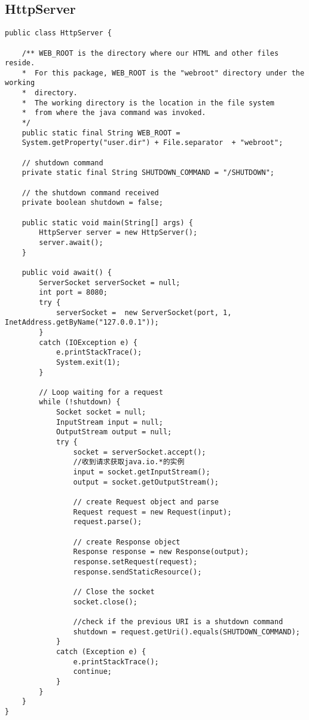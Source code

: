 \subsection{HttpServer}
\begin{lstlisting}
public class HttpServer {
	
	/** WEB_ROOT is the directory where our HTML and other files reside.
	*  For this package, WEB_ROOT is the "webroot" directory under the working
	*  directory.
	*  The working directory is the location in the file system
	*  from where the java command was invoked.
	*/
	public static final String WEB_ROOT =
	System.getProperty("user.dir") + File.separator  + "webroot";
	
	// shutdown command
	private static final String SHUTDOWN_COMMAND = "/SHUTDOWN";
	
	// the shutdown command received
	private boolean shutdown = false;
	
	public static void main(String[] args) {
		HttpServer server = new HttpServer();
		server.await();
	}
	
	public void await() {
		ServerSocket serverSocket = null;
		int port = 8080;
		try {
			serverSocket =  new ServerSocket(port, 1, InetAddress.getByName("127.0.0.1"));
		}
		catch (IOException e) {
			e.printStackTrace();
			System.exit(1);
		}
		
		// Loop waiting for a request
		while (!shutdown) {
			Socket socket = null;
			InputStream input = null;
			OutputStream output = null;
			try {
				socket = serverSocket.accept();
				//收到请求获取java.io.*的实例
				input = socket.getInputStream();
				output = socket.getOutputStream();
				
				// create Request object and parse
				Request request = new Request(input);
				request.parse();
				
				// create Response object
				Response response = new Response(output);
				response.setRequest(request);
				response.sendStaticResource();
				
				// Close the socket
				socket.close();
				
				//check if the previous URI is a shutdown command
				shutdown = request.getUri().equals(SHUTDOWN_COMMAND);
			}
			catch (Exception e) {
				e.printStackTrace();
				continue;
			}
		}
	}
}
\end{lstlisting}
